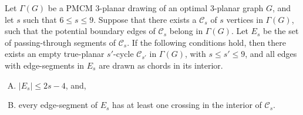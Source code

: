 \begin{lemma}
Let $\Gamma(G)$ be a PMCM $3$-planar drawing of an optimal $3$-planar graph $G$, and let $s$ such that $6\leq s\leq 9$. Suppose that there exists a \pp $\mathcal{C}_s$ of $s$ vertices in $\Gamma(G)$, such that the potential boundary edges of $\mathcal{C}_s$ belong in $\Gamma(G)$. Let $E_s$ be the set of passing-through segments of $\mathcal{C}_s$. If the following conditions hold, then there exists an empty true-planar $s'$-cycle $\mathcal{C}_{s'}$ in $\Gamma(G)$, with $s\leq s'\leq 9$, and all edges with edge-segments in $E_s$ are drawn as chords in its interior.
\begin{enumerate}[C.1:]
\item $|E_s|\leq 2s-4$, and, 
\item every edge-segment of $E_s$ has at least one crossing in the interior of $\mathcal{C}_s$.
\end{enumerate}
\label{lem:size9}
\end{lemma}

